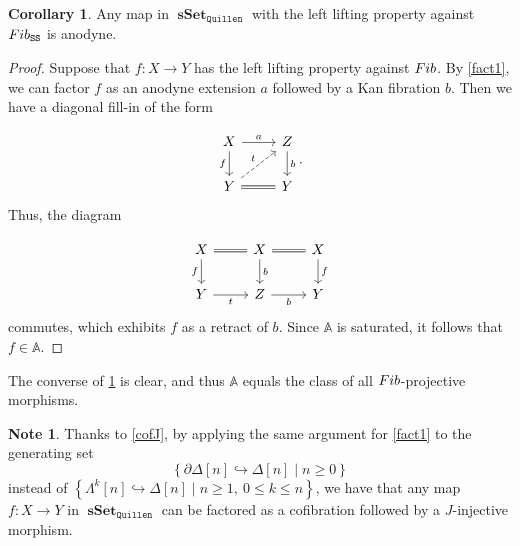 \documentclass[10pt,letterpaper,cm]{nupset}
\theoremstyle{definition}
\newtheorem{note}[definition]{Note}
\theoremstyle{theorem}
\newtheorem{corollary}[definition]{Corollary}
\theoremstyle{remark}
\newcommand{\0}{\mathbf{0}}
\newcommand{\1}{\mathbf{1}}
\newcommand{\2}{\mathbf{2}}
\DeclareMathOperator{\sset}{\mathbf{sSet}}
\DeclareMathOperator{\fib}{\mathnormal{Fib}}
\begin{document}
\begin{corollary}\label{anocof}
Any map in $\sset_{\mathtt{Quillen}}$ with the left lifting property against $\fib_{\mathtt{SS}}$ is anodyne.
\end{corollary}
\begin{proof}
Suppose that $f: X \to Y$ has the left lifting property against $\fib$. By \cref{fact1}, we can factor $f$ as an anodyne extension $a$ followed by a Kan fibration $b$. Then we have a diagonal fill-in of the form

\[
\begin{tikzcd}
X \arrow[r, "a"] \arrow[d, "f"']    & Z \arrow[d, "b"] \\
Y \arrow[r, equal] \arrow[ru, "t", dashed] & Y               
\end{tikzcd}.
\] Thus, the diagram

\[
\begin{tikzcd}
X \arrow[r, equal] \arrow[d, "f"'] & X \arrow[r, equal] \arrow[d, "b"] & X \arrow[d, "f"] \\
Y \arrow[r, "t"']           & Z \arrow[r, "b"']          & Y               
\end{tikzcd}
\] 
commutes, which exhibits $f$ as a retract of $b$. Since $\mathbb{A}$ is saturated, it follows that $f\in \mathbb{A}$.
\end{proof}

\smallskip

The converse of \cref{anocof} is clear, and thus  $\mathbb{A}$ equals the class of all $\fib$-projective morphisms.

\smallskip 

\begin{note}
Thanks to \cref{cofJ}, by applying the same argument for \cref{fact1} to the generating set 
\[
\left\{\partial{\Delta[n]} \hookrightarrow \Delta[n] \mid n \geq 0\right\}
\] instead of  $\left\{\Lambda^k[n] \hookrightarrow \Delta[n] \mid n \geq 1, \ 0\leq k \leq n\right\}$, we have that any map $f: X \to Y$ in $\sset_{\mathtt{Quillen}}$ can be factored as a cofibration followed by a $J$-injective morphism.
\end{note}

\smallskip
\end{document}
